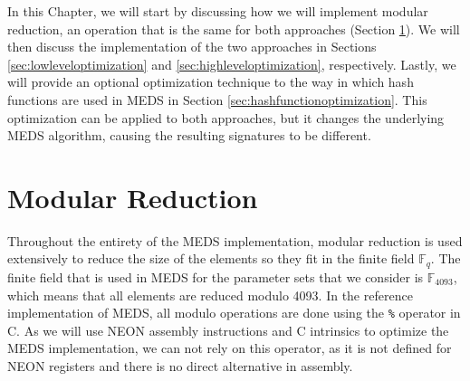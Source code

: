 \documentclass[11pt,a4paper]{report}
\theoremstyle{definition}
\begin{document}
In this Chapter, we will start by discussing how we will implement modular reduction, an operation that is the same for both approaches (Section \ref{sec:modularreduction}). We will then discuss the implementation of the two approaches in Sections \ref{sec:lowleveloptimization} and \ref{sec:highleveloptimization}, respectively. Lastly, we will provide an optional optimization technique to the way in which hash functions are used in MEDS in Section \ref{sec:hashfunctionoptimization}. This optimization can be applied to both approaches, but it changes the underlying MEDS algorithm, causing the resulting signatures to be different.

\section{Modular Reduction}
\label{sec:modularreduction}
Throughout the entirety of the MEDS implementation, modular reduction is used extensively to reduce the size of the elements so they fit in the finite field $\mathbb{F}_q$. The finite field that is used in MEDS for the parameter sets that we consider is $\mathbb{F}_{4093}$, which means that all elements are reduced modulo 4093. In the reference implementation of MEDS, all modulo operations are done using the \texttt{\%} operator in C. As we will use NEON assembly instructions and C intrinsics to optimize the MEDS implementation, we can not rely on this operator, as it is not defined for NEON registers and there is no direct alternative in assembly.
\end{document}

